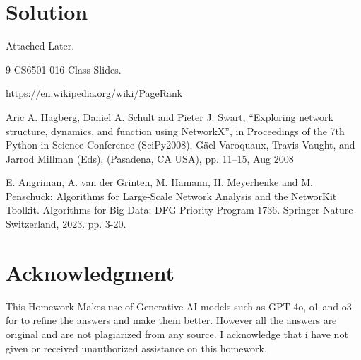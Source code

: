\documentclass[a4paper,12pt]{article}
\begin{document}
\section*{Solution}

Attached Later.

\begin{thebibliography}{9}
  CS6501-016 Class Slides.

  https://en.wikipedia.org/wiki/PageRank

  Aric A. Hagberg, Daniel A. Schult and Pieter J. Swart, “Exploring network structure, dynamics, and function using NetworkX”, in Proceedings of the 7th Python in Science Conference (SciPy2008), Gäel Varoquaux, Travis Vaught, and Jarrod Millman (Eds), (Pasadena, CA USA), pp. 11–15, Aug 2008
 
  E. Angriman, A. van der Grinten, M. Hamann, H. Meyerhenke and M. Penschuck: Algorithms for Large-Scale Network Analysis and the NetworKit Toolkit. Algorithms for Big Data: DFG Priority Program 1736. Springer Nature Switzerland, 2023. pp. 3-20. 



\end{thebibliography}





\section*{Acknowledgment}
This Homework Makes use of Generative AI models such as GPT 4o, o1 and o3 for to refine the answers and make them better. However all the answers are original and are not plagiarized from any source. I acknowledge that i have not given or received unauthorized assistance on this homework.
\end{document}
